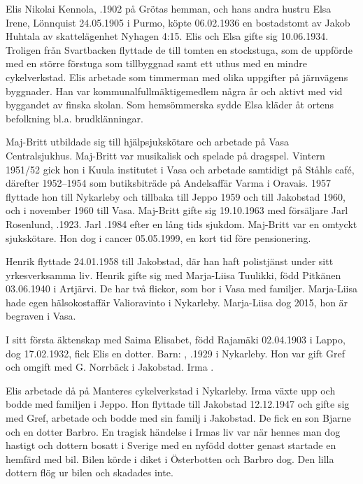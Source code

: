 Elis Nikolai Kennola, .1902 på Grötas hemman, och hans	andra hustru Elsa Irene, \textborn Lönnquist 24.05.1905 i Purmo, köpte	06.02.1936 en bostadstomt av Jakob Huhtala av skattelägenhet Nyhagen 4:15. Elis och Elsa gifte sig 10.06.1934. Troligen från Svartbacken flyttade de till tomten en stockstuga, som de uppförde med en större förstuga som tillbyggnad samt ett uthus med en mindre	cykelverkstad. Elis arbetade som timmerman med olika uppgifter på järnvägens byggnader. Han var kommunalfullmäktigemedlem några år och aktivt med vid byggandet av finska skolan. Som hemsömmerska sydde Elsa kläder åt ortens	befolkning bl.a. brudklänningar.
\begin{jhchildren}
  \item {}
  \item {}
\end{jhchildren}

Maj-Britt utbildade sig till hjälpsjukskötare och arbetade på Vasa Centralsjukhus. Maj-Britt var musikalisk och spelade på dragspel. Vintern 1951/52 gick hon i Kuula institutet i Vasa	 och arbetade samtidigt på Ståhls café, därefter 1952--1954 som butiksbiträde på Andelsaffär Varma i Oravais. 1957 flyttade hon till Nykarleby och tillbaka till Jeppo 1959 och till Jakobstad 1960, och i november 1960 till Vasa. Maj-Britt 	gifte sig 19.10.1963 med försäljare Jarl Rosenlund, .1923. Jarl .1984 efter en lång tids sjukdom. Maj-Britt var en omtyckt sjukskötare. Hon dog i cancer 05.05.1999, en kort tid före pensionering.

Henrik flyttade 24.01.1958 till Jakobstad, där han haft polistjänst under sitt yrkesverksamma liv. Henrik gifte sig med Marja-Liisa Tuulikki, född 	Pitkänen 03.06.1940 i Artjärvi. De har två flickor, som bor i Vasa med familjer. Marja-Liisa hade egen hälsokostaffär Valioravinto i Nykarleby. Marja-Liisa	dog 2015, hon är begraven i Vasa.

I sitt första äktenskap med Saima Elisabet, född Rajamäki 02.04.1903 i Lappo, dog 17.02.1932, fick Elis en dotter.
Barn: , .1929 i Nykarleby. Hon var gift Gref och omgift med G. Norrbäck i Jakobstad. Irma .

Elis arbetade då på Manteres cykelverkstad i Nykarleby. Irma växte upp och bodde med familjen i Jeppo. Hon flyttade till Jakobstad 12.12.1947 och gifte sig med Gref, arbetade och bodde med sin familj i Jakobstad. De fick en son Bjarne och en dotter Barbro. En tragisk	händelse i Irmas liv var när hennes man dog hastigt och dottern	bosatt i Sverige med en nyfödd dotter genast startade en hemfärd med 	bil. Bilen körde i diket i Österbotten och Barbro dog. Den lilla dottern flög ur bilen och skadades inte.

